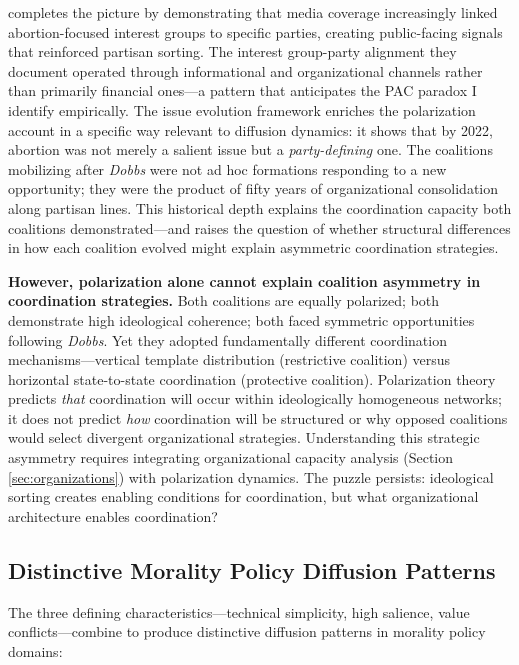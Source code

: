 \textcite{CarminesGerrityWagner2010} completes the picture by demonstrating that media coverage increasingly linked abortion-focused interest groups to specific parties, creating public-facing signals that reinforced partisan sorting. The interest group-party alignment they document operated through informational and organizational channels rather than primarily financial ones---a pattern that anticipates the PAC paradox I identify empirically.
The issue evolution framework enriches the polarization account in a specific way relevant to diffusion dynamics: it shows that by 2022, abortion was not merely a salient issue but a \emph{party-defining} one. The coalitions mobilizing after \emph{Dobbs} were not ad hoc formations responding to a new opportunity; they were the product of fifty years of organizational consolidation along partisan lines. This historical depth explains the coordination capacity both coalitions demonstrated---and raises the question of whether structural differences in how each coalition evolved might explain asymmetric coordination strategies.

\textbf{However, polarization alone cannot explain coalition asymmetry in coordination strategies.} Both coalitions are equally polarized; both demonstrate high ideological coherence; both faced symmetric opportunities following \emph{Dobbs}. Yet they adopted fundamentally different coordination mechanisms---vertical template distribution (restrictive coalition) versus horizontal state-to-state coordination (protective coalition). Polarization theory predicts \emph{that} coordination will occur within ideologically homogeneous networks; it does not predict \emph{how} coordination will be structured or why opposed coalitions would select divergent organizational strategies. Understanding this strategic asymmetry requires integrating organizational capacity analysis (Section \ref{sec:organizations}) with polarization dynamics. The puzzle persists: ideological sorting creates enabling conditions for coordination, but what organizational architecture enables coordination?

\subsection{Distinctive Morality Policy Diffusion Patterns}

The three defining characteristics---technical simplicity, high salience, value conflicts---combine to produce distinctive diffusion patterns in morality policy domains:

